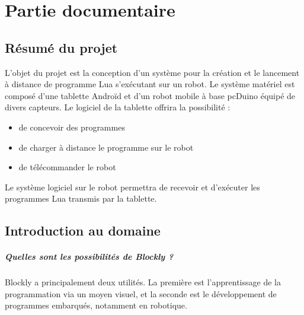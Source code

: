 \documentclass[12pt,francais]{report}
\begin{document}
\chapter*{Partie documentaire}	

\section*{Résumé du projet}	

L’objet du projet est la conception d'un système pour la création et le lancement à distance de programme Lua s'exécutant sur un robot. Le système matériel est composé d'une tablette Androïd et d'un robot mobile à base pcDuino équipé de divers capteurs. Le logiciel de la tablette offrira la possibilité : 
\begin{itemize}
\item de concevoir des programmes
\item de charger à distance le programme sur le robot 
\item de télécommander le robot 
\end{itemize} 
Le système logiciel sur le robot permettra de recevoir et d'exécuter les programmes Lua transmis par la tablette.
		
\newpage 
\section*{Introduction au domaine}

\paragraph*{Quelles sont les possibilités de Blockly ?\\}

Blockly a principalement deux utilités. La première est l'apprentissage de la programmation via un moyen visuel, et la seconde est le développement de programmes embarqués, notamment en robotique.
	
\end{document}
